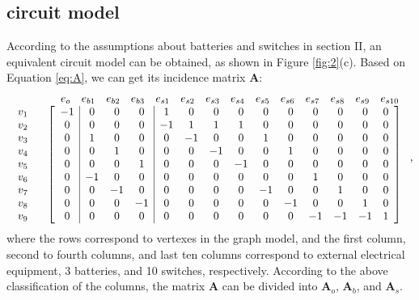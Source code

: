 \documentclass{article}
\begin{document}
\subsection{circuit model}

According to the assumptions about batteries and switches in section II, an equivalent circuit model can be obtained, as shown in Figure \ref{fig:2}(c).
Based on Equation \ref{eq:A}, we can get its incidence matrix $\bm{A}$:\
{\setlength{\arraycolsep}{4pt}
\begin{equation}
\begin{array}{cc}
    &  \begin{array}{c c ccc cccccccccc} & e_o &e_{b1}  &e_{b2} & e_{b3} & e_{s1} & e_{s2} & e_{s3} & e_{s4} & e_{s5} & e_{s6} & e_{s7} & e_{s8} & e_{s9} & e_{s10} \end{array}\\
        \begin{array}{c} v_1\\v_2\\v_3\\v_4\\v_5\\v_6\\v_7\\v_8\\v_9\end{array} & \left[
    \begin{array}{c|ccc|cccccccccc}
        -1  &0 &0 &0   &1 &0 &0 &0 &0 &0 &0 &0 &0 &0\\
        0   &0 &0 &0   &-1&1 &1 &1 &0 &0 &0 &0 &0 &0\\
        0   &1 &0 &0   &0 &-1&0 &0 &1 &0 &0 &0 &0 &0\\
        0   &0 &1 &0   &0 &0 &-1&0 &0 &1 &0 &0 &0 &0\\
        0   &0 &0 &1   &0 &0 &0 &-1&0 &0 &0 &0 &0 &0\\
        0   &-1&0 &0   &0 &0 &0 &0 &0 &0 &1 &0 &0 &0\\
        0   &0 &-1&0   &0 &0 &0 &0 &-1&0 &0 &1 &0 &0\\
        0   &0 &0 &-1  &0 &0 &0 &0 &0 &-1&0 &0 &1 &0\\
        0   &0 &0 &0   &0 &0 &0 &0 &0 &0 &-1&-1&-1&1\\
    \end{array} \right]
\end{array},
\end{equation}
}
where the rows correspond to vertexes in the graph model, and the first column, second to fourth columns, and last ten columns correspond to external electrical equipment, 3 batteries, and 10 switches, respectively.
According to the above classification of the columns, the matrix $\bm{A}$ can be divided into $\bm{A}_o$, $\bm{A}_b$, and $\bm{A}_s$.
\end{document}
